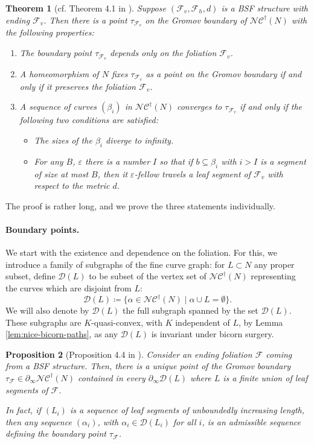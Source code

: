 \documentclass[a4paper]{article}
\let\epsilon\varepsilon %
\newtheorem{theorem}{Theorem}[section]
\newtheorem{proposition}[theorem]{Proposition}
\newcommand{\fncg}{\mathcal{NC}^\dagger}
\begin{document}
\begin{theorem}[cf. Theorem 4.1 in \cite{BHW2}]\label{thm:convergence-criterion}
Suppose $(\mathcal{F}_v,\mathcal{F}_h,d)$ is a BSF structure with ending $\mathcal{F}_v$.
Then there is a point $\tau_{\mathcal{F}_v}$ on the Gromov boundary of $\fncg(N)$ with the following properties: \begin{enumerate}
    \item The boundary point $\tau_{\mathcal{F}_v}$ depends only on the foliation $\mathcal{F}_v$.
    \item A homeomorphism of $N$ fixes $\tau_{\mathcal{F}_v}$ as a point on the Gromov boundary if and only if it preserves the foliation $\mathcal{F}_v$.
    \item A sequence of curves $(\beta_i)$ in $\fncg(N)$ converges to $\tau_{\mathcal{F}_v}$ if and only if 
    the following two conditions are satisfied: \begin{itemize}
        \item The sizes of the $\beta_i$ diverge to infinity.
        \item For any $B$, $\epsilon$ there is a number $I$ so that if $b\subseteq \beta_i$ with $i>I$ is a segment of size at most $B$, then it $\epsilon$-fellow travels a leaf segment of $\mathcal{F}_v$ with respect to the metric $d$.
    \end{itemize}
     
\end{enumerate}
\end{theorem}

The proof is rather long, and we prove the three statements individually.

\paragraph{Boundary points.} 
We start with the existence and dependence on the foliation.
For this, we introduce a family of subgraphs of the fine curve graph:
for $L\subset N$ any proper subset, define $\mathcal{D}(L)$ to be subset of the vertex set of $\fncg(N)$ representing the curves which are disjoint from $L$:
    \[ \mathcal{D}(L) \coloneqq \{\alpha \in \fncg(N) \mid \alpha \cup L = \emptyset \}. \]
We will also denote by $\mathcal{D}(L)$ the full subgraph spanned by the set $\mathcal{D}(L)$.
These subgraphs are $K$-quasi-convex, with $K$ independent of $L$, by Lemma \ref{lem:nice-bicorn-paths}, as any $\mathcal{D}(L)$ is invariant under bicorn surgery.

\begin{proposition}[Proposition 4.4 in \cite{BHW2}]\label{prop:foliations-give-bdary-pts}
Consider an ending foliation $\mathcal{F}$ coming from a BSF structure.
Then, there is a unique point of the Gromov boundary $\tau_\mathcal{F}\in \partial_\infty\fncg(N)$ contained in every $\partial_\infty \mathcal{D}(L)$ where $L$ is a finite union of leaf segments of $\mathcal{F}$.

In fact, if $(L_i)$ is a sequence of leaf segments of unboundedly increasing length, then any sequence $(\alpha_i)$, with $\alpha_i \in \mathcal{D}(L_i)$ for all $i$, is an admissible sequence defining the boundary point $\tau_\mathcal{F}$.
\end{proposition}
\end{document}
